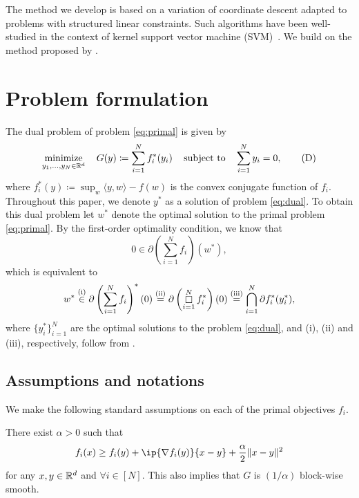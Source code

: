 The method we develop is based on a variation of coordinate descent adapted to problems with structured linear constraints. Such algorithms have been well-studied in the context of kernel support vector machine (SVM)~\citep{lut93,platt1998sequential,libsvm}. We build on the method proposed by \citet{necoara2017random}.

\section{Problem formulation}
\label{sec:problem}

The dual problem of problem \eqref{eq:primal} is given by 
\begin{equation} \label{eq:dual}
  \displaystyle\mathop{\hbox{\rm minimize}}_{y_1, \dots, y_N \in \mathbb{R}^d}\enspace\enspace G(y) \coloneqq \sum_{i=1}^N f_i^*(y_i) \enspace\enspace\mathop{\hbox{\rm subject to}}\enspace\enspace \sum_{i=1}^N y_i = 0, \tag{D}
\end{equation}
where $f_i^*(y) \coloneqq \sup_{w} \langle y, w \rangle - f(w)$ is the convex conjugate function of $f_i$. Throughout this paper, we denote $y^*$ as a solution of problem \eqref{eq:dual}. To obtain this dual problem let $w^*$ denote the optimal solution to the primal problem \autoref{eq:primal}. By the first-order optimality condition, we know that 
\[0 \in \partial\left(\sum_{i = 1}^N f_i\right)(w^*),\]
which is equivalent to 
\[w^* \overset{\rm{(i)}}{\in} \partial\left(\sum_{i = 1}^N f_i\right)^*(0) \overset{\rm{(ii)}}{=} \partial\left(\mathop\square_{i=1}^N f_i^*\right)(0) \overset{\rm{(iii)}}{=} \bigcap_{i=1}^N \partial f_i^*(y_i^*),\]
where $\{y_i^*\}_{i=1}^N$ are the optimal solutions to the problem \eqref{eq:dual}, and (i), (ii) and (iii), respectively, follow from  \citet[Proposition~E.1.4.3, Proposition~E.2.3.2 and Corollary~D.4.5.5]{hiriart-urruty01}.

\subsection{Assumptions and notations}

We make the following standard assumptions on each of the primal objectives $f_i$.

\begin{assumption} \label{assum:stronglyCvx}
  There exist $\alpha > 0$ such that
  \[
    f_i(x) \geq f_i(y) + \ip{\nabla f_i(y)}{x-y} + \frac{\alpha}{2} \| x - y \|^2
  \]
  for any $x, y \in \mathbb{R}^d$ and $\forall i \in [N]$. This also implies that $G$ is $(1/\alpha)$ block-wise smooth.
\end{assumption}


